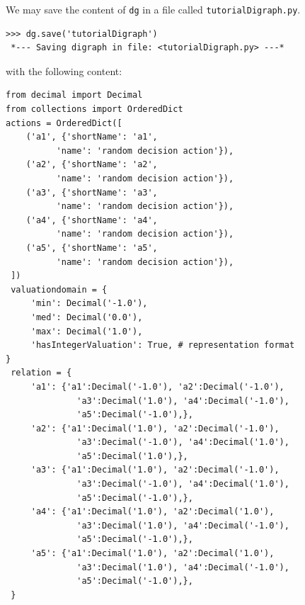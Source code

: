 We may save the content of \texttt{dg} in a file called \texttt{tutorialDigraph.py}.
\begin{lstlisting}
>>> dg.save('tutorialDigraph')
 *--- Saving digraph in file: <tutorialDigraph.py> ---*
\end{lstlisting}
with the following content:
\begin{lstlisting}[caption={A stored digraph instance},label=list:1.2]
from decimal import Decimal
from collections import OrderedDict
actions = OrderedDict([
    ('a1', {'shortName': 'a1',
          'name': 'random decision action'}),
    ('a2', {'shortName': 'a2',
          'name': 'random decision action'}),
    ('a3', {'shortName': 'a3',
          'name': 'random decision action'}),
    ('a4', {'shortName': 'a4',
          'name': 'random decision action'}),
    ('a5', {'shortName': 'a5',
          'name': 'random decision action'}),
 ])
 valuationdomain = {
     'min': Decimal('-1.0'),
     'med': Decimal('0.0'),
     'max': Decimal('1.0'),
     'hasIntegerValuation': True, # representation format
}
 relation = {
     'a1': {'a1':Decimal('-1.0'), 'a2':Decimal('-1.0'),
              'a3':Decimal('1.0'), 'a4':Decimal('-1.0'),
              'a5':Decimal('-1.0'),},
     'a2': {'a1':Decimal('1.0'), 'a2':Decimal('-1.0'),
              'a3':Decimal('-1.0'), 'a4':Decimal('1.0'),
              'a5':Decimal('1.0'),},
     'a3': {'a1':Decimal('1.0'), 'a2':Decimal('-1.0'),
              'a3':Decimal('-1.0'), 'a4':Decimal('1.0'),
              'a5':Decimal('-1.0'),},
     'a4': {'a1':Decimal('1.0'), 'a2':Decimal('1.0'),
              'a3':Decimal('1.0'), 'a4':Decimal('-1.0'),
              'a5':Decimal('-1.0'),},
     'a5': {'a1':Decimal('1.0'), 'a2':Decimal('1.0'),
              'a3':Decimal('1.0'), 'a4':Decimal('-1.0'),
              'a5':Decimal('-1.0'),},
 }
\end{lstlisting}


